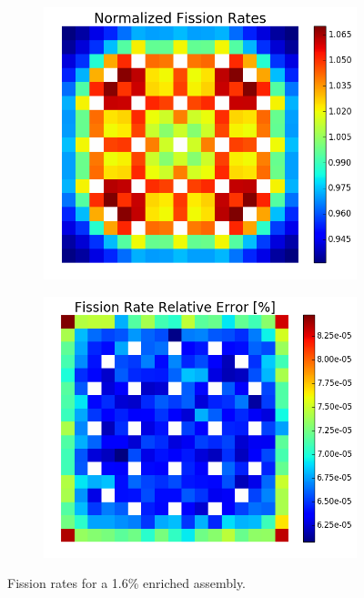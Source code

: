 \begin{figure}[h!]
\centering
\begin{subfigure}{0.44\textwidth}
  \centering
  \includegraphics[width=\linewidth]{figures/benchmarks/fission-rates/fiss-mean-fuel-16}
  \caption{}
  \label{fig:chap7-fiss-rate-mean-1.6-assm}
\end{subfigure}%
\begin{subfigure}{0.44\textwidth}
  \centering
  \includegraphics[width=\linewidth]{figures/benchmarks/fission-rates/fiss-rel-err-fuel-16}
  \caption{}
  \label{fig:chap7-fiss-rate-rel-err-1.6-assm}
\end{subfigure}%
\caption[Fission rates for a 1.6\% enriched assembly]{Fission rates for a 1.6\% enriched assembly.}
\label{fig:chap7-fiss-rates-1.6-assm}
\end{figure}

